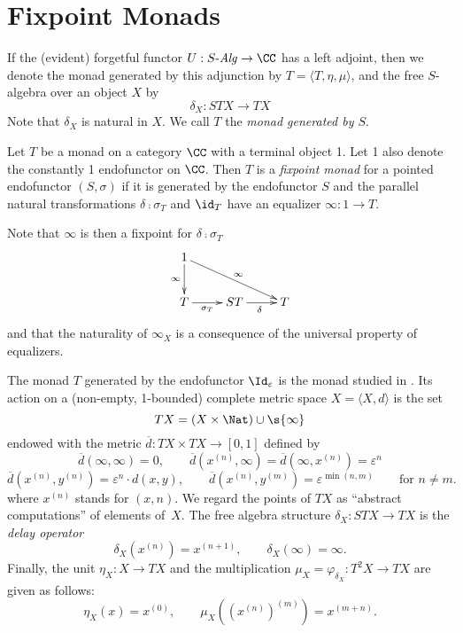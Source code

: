 \documentclass[11pt,a4paper]{article}
\newcommand{\tuple}[1]{\langle #1 \rangle }
\renewcommand{\alg}[1]{#1 \mbox{-\textit{Alg}}}
\newcommand{\contr}{\sigma}
\newcommand{\delay}{\delta}
\newcommand{\isom}[1]{\varphi_{#1}}
\newcommand{\ti}{T}
\newcommand{\esse}{S}
\newcommand{\computation}[2]{#2^{(#1)}}
\newcommand{\h}{\varepsilon}
\newcommand{\dd}{\overline{d}}
\begin{document}
\section{Fixpoint Monads}

If the (evident) forgetful functor $U : \alg{\esse} \rightarrow \CC$
has a left adjoint, then
we denote the monad generated by this adjunction by 
$\ti = \tuple{\ti ,\eta ,\mu}$,
and the free $\esse$-algebra over an object $X$ by
$$\delta_X : \esse \ti X \rightarrow \ti X$$
Note that $\delta_X$ is natural in $X$.
We call $\ti$ the \emph{monad generated by $\esse$}.

\begin{definition}
Let $T$ be a monad on a category $\CC$ with a terminal object 1.
Let 1 also denote the constantly 1 endofunctor on $\CC$.
Then $\ti$ 
is a \emph{fixpoint monad} for 
a pointed endofunctor $(\esse , \contr )$
if 
it is generated by the endofunctor $\esse$
and the parallel natural transformations
$\delta \comp \contr_\ti$ and $\id_T$
have an equalizer $\infty : 1 \rightarrow \ti $.
\close
\end{definition}
Note that $\infty$ is then a fixpoint for $\delta \comp \contr_\ti$
\begin{equation}
  \label{eq:fpmonad}
  \xymatrix{
1 \ar[d]_-{\infty}  \ar[rrd]^{\infty} & &
\\
\ti  \ar[r]_-{\contr_{\ti}} & 
{\esse \ti} \ar[r]_{\delta} & \ti
}
\end{equation}
and that the naturality of $\infty_X$ is a consequence
of the universal property of equalizers.

\begin{example}
  The monad $T$ generated by the endofunctor $\Id_\varepsilon$ is the
  monad studied in \cite{escardo:metric}.  Its action on a (non-empty,
  1-bounded) complete metric space $X=\tuple{X,d}$ is the set
  $$\ti X = (X\times \Nat ) \cup \s{\infty}$$
  endowed with the metric
  $\dd :\ti X \times \ti X \rightarrow [0,1]$ defined by
$$
\dd (\infty,\infty) = 0, \qquad 
\dd (\computation{n}{x} ,\infty) = \dd (\infty,\computation{n}{x}) = \h^{n}
$$
$$
\dd (\computation{n}{x},\computation{n}{y})= \h^{n}\cdot d(x,y), \qquad
\dd (\computation{n}{x},\computation{m}{y})=\h^{\min(n,m)} \qquad
\mbox{for $n \ne m$}. 
$$
where $\computation{n}{x}$ stands for $(x,n)$.  We regard the
points of $\ti X$ as ``abstract computations'' of elements of~$X$.
The free algebra structure $\delta_X : \esse \ti X \rightarrow \ti X$
is the \emph{delay operator}
\[
\delay_{X}(\computation{n}{x}) = \computation{n+1}{x}, \qquad
\delay_{X}(\infty) = \infty.
\]
Finally, the unit $\eta_X : X \rightarrow \ti X$ and the
multiplication $\mu_X = \isom{\delta_X} : \ti^2 X \rightarrow \ti X$
are given as follows:
\[ 
\eta_X(x)  = \computation{0}{x}, \qquad
\mu_X\left(\computation{m}{\left(\computation{n}{x}\right)}\right) =
\computation{m+n}{x}.
\] 
\end{example}
\end{document}
